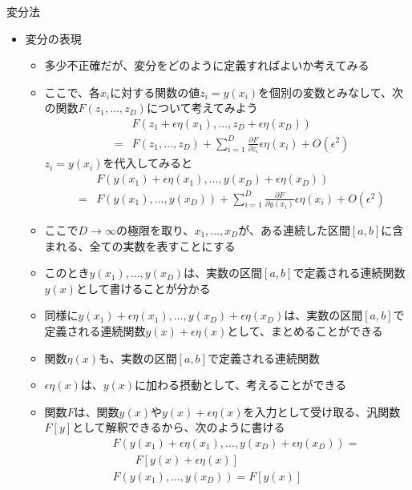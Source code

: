 \documentclass[dvipdfmx,notheorems,t]{beamer}
\begin{document}
\begin{frame}{変分法}

\begin{itemize}
	\item 変分の表現
	\begin{itemize}
		\item 多少不正確だが、変分をどのように定義すればよいか考えてみる
		\newline
		\item ここで、各$x_i$に対する関数の値$z_i = y(x_i)$を個別の変数とみなして、次の関数$F(z_1, \ldots, z_D)$について考えてみよう
		\begin{eqnarray}
			&& F(z_1 + \epsilon \eta(x_1), \ldots, z_D + \epsilon \eta(x_D)) \nonumber \\
			&=& F(z_1, \ldots, z_D) + \sum_{i = 1}^D \frac{\partial F}{\partial z_i} \epsilon \eta(x_i) + O(\epsilon^2)
		\end{eqnarray}
		$z_i = y(x_i)$を代入してみると
		\begin{eqnarray}
			&& F(y(x_1) + \epsilon \eta(x_1), \ldots, y(x_D) + \epsilon \eta(x_D)) \nonumber \\
			&=& F(y(x_1), \ldots, y(x_D)) + \sum_{i = 1}^D \frac{\partial F}{\partial y(x_i)} \epsilon \eta(x_i) + O(\epsilon^2)
		\end{eqnarray}
		
		\item ここで$D \to \infty$の極限を取り、$x_1, \ldots, x_D$が、ある連続した区間$[a, b]$に含まれる、全ての実数を表すことにする
		\newline
		\item このとき$y(x_1), \ldots, y(x_D)$は、実数の区間$[a, b]$で定義される\alert{連続関数}$y(x)$として書けることが分かる
		\newline
		\item 同様に$y(x_1) + \epsilon \eta(x_1), \ldots, y(x_D) + \epsilon \eta(x_D)$は、実数の区間$[a, b]$で定義される\alert{連続関数}$y(x) + \epsilon \eta(x)$として、まとめることができる
		\newline
		\item 関数$\eta(x)$も、実数の区間$[a, b]$で定義される連続関数
		\item $\epsilon \eta(x)$は、$y(x)$に加わる\alert{摂動}として、考えることができる
		\newline
		\item 関数$F$は、関数$y(x)$や$y(x) + \epsilon \eta(x)$を入力として受け取る、\alert{汎関数}$F[y]$として解釈できるから、次のように書ける
		\begin{eqnarray}
			&& F(y(x_1) + \epsilon \eta(x_1), \ldots, y(x_D) + \epsilon \eta(x_D)) = \nonumber \\
			&& \qquad F[y(x) + \epsilon \eta(x)] \\
			&& F(y(x_1), \ldots, y(x_D)) = F[y(x)]
		\end{eqnarray}
		

\end{itemize}
\end{itemize}
\end{frame}
\end{document}
